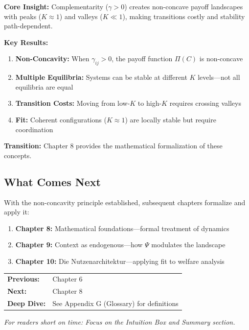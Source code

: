 \begin{tcolorbox}[
    colback=blue!5!white,
    colframe=blue!75!black,
    title={\textbf{Chapter 7 Summary: Complementarity, Fit, and Non-Concavity}}
]

\textbf{Core Insight:} Complementarity ($\gamma > 0$) creates non-concave payoff landscapes with peaks ($K \approx 1$) and valleys ($K \ll 1$), making transitions costly and stability path-dependent.

\textbf{Key Results:}
\begin{enumerate}[nosep]
    \item \textbf{Non-Concavity:} When $\gamma_{ij} > 0$, the payoff function $\Pi(C)$ is non-concave
    \item \textbf{Multiple Equilibria:} Systems can be stable at different $K$ levels---not all equilibria are equal
    \item \textbf{Transition Costs:} Moving from low-$K$ to high-$K$ requires crossing valleys
    \item \textbf{Fit:} Coherent configurations ($K \approx 1$) are locally stable but require coordination
\end{enumerate}

\textbf{Transition:} Chapter 8 provides the mathematical formalization of these concepts.
\end{tcolorbox}

\subsection{What Comes Next}
\label{sec:ch7-next}

With the non-concavity principle established, subsequent chapters formalize and apply it:

\begin{enumerate}[nosep]
    \item \textbf{Chapter 8:} Mathematical foundations---formal treatment of dynamics
    \item \textbf{Chapter 9:} Context as endogenous---how $\Psi$ modulates the landscape
    \item \textbf{Chapter 10:} Die Nutzenarchitektur---applying fit to welfare analysis
\end{enumerate}

\begin{tcolorbox}[
    colback=green!5!white,
    colframe=green!75!black,
    title={\textbf{Reading Path}},
    fonttitle=\bfseries
]
\begin{tabular}{@{}ll@{}}
\textbf{Previous:} & Chapter 6 \\
\textbf{Next:} & Chapter 8 \\
\textbf{Deep Dive:} & See Appendix G (Glossary) for definitions \\
\end{tabular}

\medskip
\textit{For readers short on time: Focus on the Intuition Box and Summary section.}
\end{tcolorbox}

